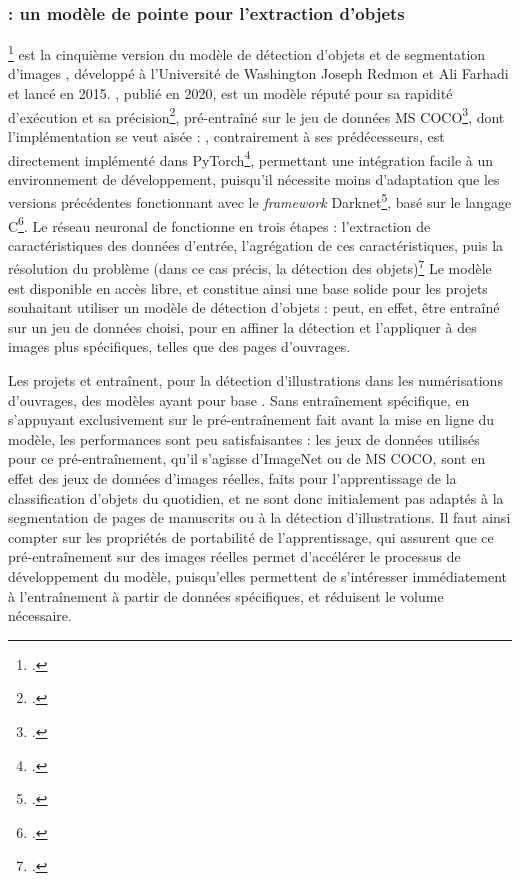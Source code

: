     \subsubsection{\yolov : un modèle de pointe pour l'extraction d'objets}
	\yolov\footcite{ultralyticsUltralyticsYOLOv8Docs} est la cinquième version du modèle de détection d'objets et de segmentation d'images \yolo, développé à l'Université de Washington Joseph Redmon et Ali Farhadi et lancé en 2015. \yolov, publié en 2020, est un modèle réputé pour sa rapidité d'exécution et sa précision\footcite{buttnerCorDeepSacroboscoDataset2022}, pré-entraîné sur le jeu de données MS COCO\footcite{COCOCommonObjects}, dont l'implémentation se veut aisée : \yolov, contrairement à ses prédécesseurs, est directement implémenté dans PyTorch\footcite{PyTorch}, permettant une intégration facile à un environnement de développement, puisqu'il nécessite moins d'adaptation que les versions précédentes fonctionnant avec le \textit{framework} Darknet\footcite{DarknetOpenSource}, basé sur le langage C\footcite{sharmaTrainingYOLOv5Object2022}. Le réseau neuronal de \yolo fonctionne en trois étapes : l'extraction de caractéristiques des données d'entrée, l'agrégation de ces caractéristiques, puis la résolution du problème (dans ce cas précis, la détection des objets)\footcite{buttnerCorDeepSacroboscoDataset2022} Le modèle est disponible en accès libre, et constitue ainsi une base solide pour les projets souhaitant utiliser un modèle de détection d'objets : \yolov peut, en effet, être entraîné sur un jeu de données choisi, pour en affiner la détection et l'appliquer à des images plus spécifiques, telles que des pages d'ouvrages.
	
	Les projets \eida et \vhs entraînent, pour la détection d'illustrations dans les numérisations d'ouvrages, des modèles ayant pour base \yolov. Sans entraînement spécifique, en s'appuyant exclusivement sur le pré-entraînement fait avant la mise en ligne du modèle, les performances sont peu satisfaisantes : les jeux de données utilisés pour ce pré-entraînement, qu'il s'agisse d'ImageNet ou de MS COCO, sont en effet des jeux de données d'images réelles, faits pour l'apprentissage de la classification d'objets du quotidien, et ne sont donc initialement pas adaptés à la segmentation de pages de manuscrits ou à la détection d'illustrations. Il faut ainsi compter sur les propriétés de portabilité de l'apprentissage, qui assurent que ce pré-entraînement sur des images réelles permet d'accélérer le processus de développement du modèle, puisqu'elles permettent de s'intéresser immédiatement à l'entraînement à partir de données spécifiques, et réduisent le volume nécessaire. 
	

